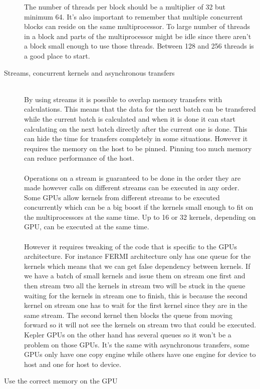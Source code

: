 \documentclass[10pt,a4paper]{report}
\begin{document}
\begin{description}
  The number of threads per block should be a multiplier of 32 but minimum 64. It's also important to remember that multiple concurrent blocks can reside on the same multiprocessor. To large number of threads in a block and parts of the multiprocessor might be idle since there aren't a block small enough to use those threads. Between 128 and 256 threads is a good place to start.\cite{cuda_best_practice}
  \item[Streams, concurrent kernels and asynchronous transfers] \hfill \\
  By using streams it is possible to overlap memory transfers with calculations. This means that the data for the next batch can be transfered while the current batch is calculated and when it is done it can start calculating on the next batch directly after the current one is done. This can hide the time for transfers completely in some situations. However it requires the memory on the host to be pinned. Pinning too much memory can reduce performance of the host.\cite{cuda}\\
  \\
  Operations on a stream is guaranteed to be done in the order they are made however calls on different streams can be executed in any order. Some GPUs allow kernels from different streams to be executed concurrently which can be a big boost if the kernels small enough to fit on the multiprocessors at the same time. Up to 16 or 32 kernels, depending on GPU, can be executed at the same time.\\
  \\
  However it requires tweaking of the code that is specific to the GPUs architecture. For instance FERMI architecture only has one queue for the kernels which means that we can get false dependency between kernels. If we have a batch of small kernels and issue them on stream one first and then stream two all the kernels in stream two will be stuck in the queue waiting for the kernels in stream one to finish, this is because the second kernel on stream one has to wait for the first kernel since they are in the same stream. The second kernel then blocks the queue from moving forward so it will not see the kernels on stream two that could be executed. Kepler GPUs on the other hand has several queues so it won't be a problem on those GPUs. It's the same with asynchronous transfers, some GPUs only have one copy engine while others have one engine for device to host and one for host to device.\cite{cuda, overlap_transfers_cuda, kepler_tuning_guide}
  \item[Use the correct memory on the GPU] \hfill \\

\end{description}
\end{document}
